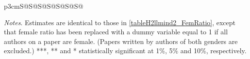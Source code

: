 \begin{table}[H]
\begin{threeparttable}
\begin{tabular}{p{3cm}S@{}S@{}S@{}S@{}S@{}S@{}S@{}}
            \bottomrule
        \end{tabular}
        \begin{tablenotes}
            \tiny
            \item \textit{Notes}. Estimates are identical to those in \autoref{tableH2llmind2_FemRatio}, except that female ratio has been replaced with a dummy variable equal to 1 if all authors on a paper are female. (Papers written by authors of both genders are excluded.) ***, ** and * statistically significant at 1\%, 5\% and 10\%, respectively.
        \end{tablenotes}
    \end{threeparttable}
\end{table}